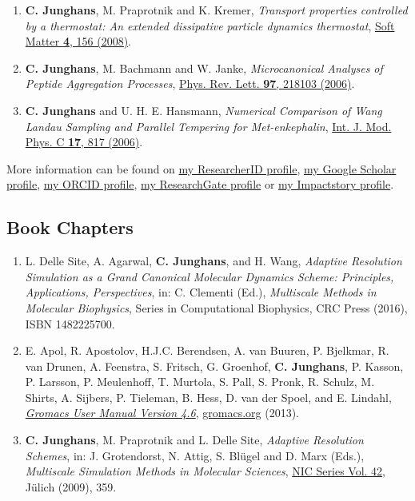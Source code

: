 \documentclass{article}
\begin{document}
\begin{enumerate}
\item[3.] \textbf{C. Junghans}, M. Praprotnik and K. Kremer,
  \textit{Transport properties controlled by a thermostat: An extended dissipative particle dynamics thermostat},
  \href{http://dx.doi.org/10.1039/b713568h}{Soft Matter \textbf{4}, 156 (2008)}.

\item[2.] \textbf{C. Junghans}, M. Bachmann and W. Janke,
  \textit{Microcanonical Analyses of Peptide Aggregation Processes},
  \href{http://dx.doi.org/10.1103/PhysRevLett.97.218103}{Phys. Rev. Lett. \textbf{97}, 218103 (2006)}.

\item[1.] \textbf{C. Junghans} and U. H. E. Hansmann,
  \textit{Numerical Comparison of Wang Landau Sampling and Parallel Tempering for Met-enkephalin}, 
  \href{http://dx.doi.org/10.1142/S012918310600931X}{Int. J. Mod. Phys. C \textbf{17}, 817 (2006)}.
\end{enumerate}

More information can be found on \href{https://www.webofscience.com/wos/author/record/G-4238-2010}{my ResearcherID profile}, \href{http://scholar.google.com/citations?user=nwPxp24AAAAJ\&pagesize=100}{my Google Scholar profile}, \href{http://orcid.org/0000-0003-0925-1458}{my ORCID profile}, \href{https://www.researchgate.net/profile/Christoph\_Junghans/publications/}{my ResearchGate profile} or \href{https://impactstory.org/u/0000-0003-0925-1458}{my Impactstory profile}.

\subsection*{Book Chapters}

\begin{enumerate}
\item[3.] L. Delle Site, A. Agarwal, \textbf{C. Junghans}, and H. Wang, 
  \textit{Adaptive Resolution Simulation as a Grand Canonical Molecular Dynamics Scheme: Principles, Applications, Perspectives},
  in: C. Clementi (Ed.),
  \textit{Multiscale Methods in Molecular Biophysics},
  Series in Computational Biophysics, CRC Press (2016), ISBN 1482225700.

\item[2.] E. Apol, R. Apostolov, H.J.C. Berendsen, A. van Buuren, P. Bjelkmar, R. van Drunen, A. Feenstra, S. Fritsch, G. Groenhof, \textbf{C. Junghans}, P. Kasson, P. Larsson, P. Meulenhoff, T. Murtola, S. Pall, S. Pronk, R. Schulz, M. Shirts, A. Sijbers, P. Tieleman, B. Hess, D. van der Spoel, and E. Lindahl, 
  \textit{\href{http://dx.doi.org/10.13140/2.1.1310.0480}{Gromacs User Manual Version 4.6}},
  \href{http://www.gromacs.org}{gromacs.org} (2013).

\item[1.] \textbf{C. Junghans}, M. Praprotnik and L. Delle Site,
  \textit{Adaptive Resolution Schemes},
  in: J. Grotendorst, N. Attig, S. Bl{\"u}gel and D. Marx (Eds.),
  \textit{Multiscale Simulation Methods in Molecular Sciences}, \href{http://juser.fz-juelich.de/record/3737/files/nic-series-volume42.pdf}{NIC Series Vol. 42}, J{\"u}lich (2009), 359.
\end{enumerate}
\end{document}
